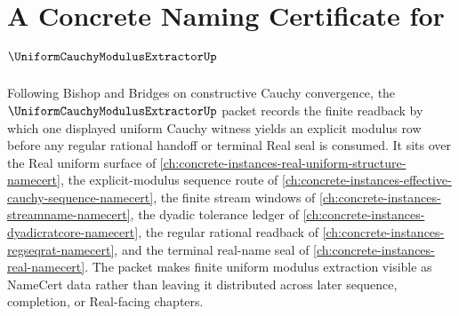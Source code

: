 \chapter{A Concrete Naming Certificate for $\UniformCauchyModulusExtractorUp$}
\label{ch:concrete-instances-uniform-cauchy-modulus-extractor-namecert}

Following Bishop and Bridges on constructive Cauchy convergence, the $\UniformCauchyModulusExtractorUp$ packet records the finite readback by which one displayed uniform Cauchy witness yields an explicit modulus row before any regular rational handoff or terminal Real seal is consumed. It sits over the Real uniform surface of \autoref{ch:concrete-instances-real-uniform-structure-namecert}, the explicit-modulus sequence route of \autoref{ch:concrete-instances-effective-cauchy-sequence-namecert}, the finite stream windows of \autoref{ch:concrete-instances-streamname-namecert}, the dyadic tolerance ledger of \autoref{ch:concrete-instances-dyadicratcore-namecert}, the regular rational readback of \autoref{ch:concrete-instances-regseqrat-namecert}, and the terminal real-name seal of \autoref{ch:concrete-instances-real-namecert}. The packet makes finite uniform modulus extraction visible as NameCert data rather than leaving it distributed across later sequence, completion, or Real-facing chapters.

